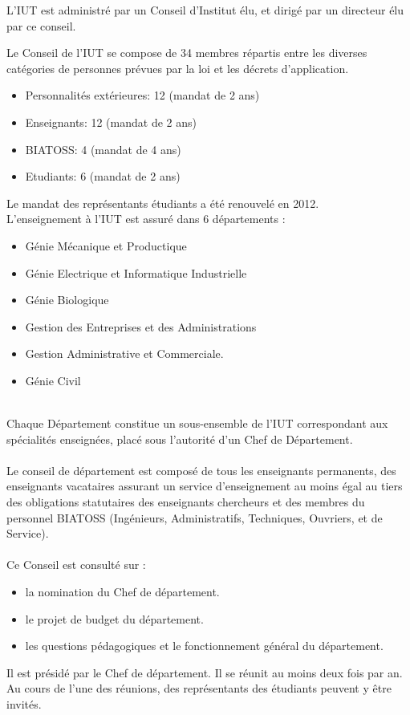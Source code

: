 \documentclass[11pt]{article}
\begin{document}
\begin{multicols*}{2}
\raggedcolumns
L'IUT est administré par un Conseil d'Institut élu, et dirigé par un directeur élu par ce conseil.

Le Conseil de l'IUT se compose de 34 membres répartis entre les diverses catégories de
personnes prévues par la loi et les décrets d'application.

\renewcommand{\labelitemi}{-}
\begin{itemize}
\item Personnalités extérieures: 12 (mandat de 2 ans)
\item Enseignants: 12 (mandat de 2 ans)
\item BIATOSS: 4 (mandat de 4 ans)
\item Etudiants: 6 (mandat de 2 ans)
\end{itemize}
Le mandat des représentants étudiants a été renouvelé en 2012.
~\\
L'enseignement à l'IUT est assuré dans 6 départements :

\begin{itemize}
\item Génie Mécanique et Productique
\item Génie Electrique et Informatique Industrielle
\item Génie Biologique
\item Gestion des Entreprises et des Administrations
\item Gestion Administrative et Commerciale.
\item Génie Civil
\end{itemize}
~\\
Chaque Département constitue un sous-ensemble de l'IUT correspondant aux spécialités enseignées, placé sous l'autorité d'un Chef de Département.\\
~\\
Le conseil de département est composé de tous les enseignants permanents, des enseignants vacataires assurant un service d'enseignement au moins égal au tiers des obligations statutaires des enseignants chercheurs et des membres du personnel BIATOSS (Ingénieurs, Administratifs, Techniques, Ouvriers, et de Service).\\
~\\
Ce Conseil est consulté sur :
\begin{itemize}
\item la nomination du Chef de département.
\item le projet de budget du département.
\item les questions pédagogiques et le fonctionnement général du département.
\end{itemize}
Il est présidé par le Chef de département. Il se réunit au moins deux fois par an. Au cours de l'une des réunions, des représentants des étudiants peuvent y être invités.

\end{multicols*}
\end{document}
